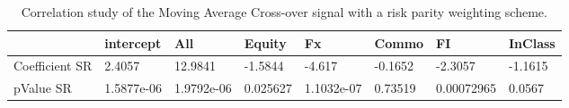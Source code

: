 \begin{table}[H]
\centering
\begin{tabular}{llllllll}
& intercept & All & Equity & Fx & Commo & FI & InClass \\ 
\hline 
Coefficient SR & 2.4057 & 12.9841 & -1.5844 & -4.617 & -0.1652 & -2.3057 & -1.1615 \\ 
pValue SR & 1.5877e-06 & 1.9792e-06 & 0.025627 & 1.1032e-07 & 0.73519 & 0.00072965 & 0.0567 \\ 
\hline
\end{tabular}
\caption{Correlation study of the Moving Average Cross-over signal with a risk parity weighting scheme.}
\label{MARP_CORR}
\end{table}
